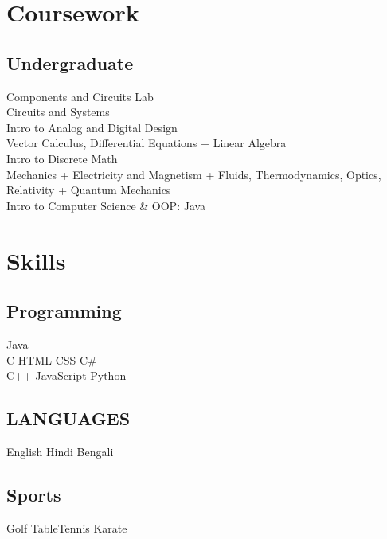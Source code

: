 \documentclass[]{deedy-resume-openfont}
\begin{document}
\begin{minipage}[t]{0.31\textwidth}
\sectionsep

\section{Coursework}

\subsection{Undergraduate}
\textbullet Components and Circuits Lab \\
\textbullet Circuits and Systems \\
\textbullet Intro to Analog and Digital Design \\
\textbullet Vector Calculus, Differential Equations + Linear Algebra \\
\textbullet Intro to Discrete Math \\
\textbullet Mechanics + Electricity and Magnetism + Fluids, Thermodynamics, Optics, Relativity + Quantum Mechanics \\
\textbullet{} Intro to Computer Science \& OOP: Java
\sectionsep


\section{Skills}
\subsection{Programming}
Java  \\
C \textbullet{} HTML \textbullet{} CSS \textbullet{} C\# \\
C++ \textbullet{} JavaScript \textbullet{} Python 
\sectionsep
\subsection{LANGUAGES}
English \textbullet{} Hindi \textbullet{} Bengali
\sectionsep

\subsection{Sports}
 Golf \textbullet{} Table\-Tennis \textbullet{} Karate\\
\sectionsep


\end{minipage}
\end{document}
